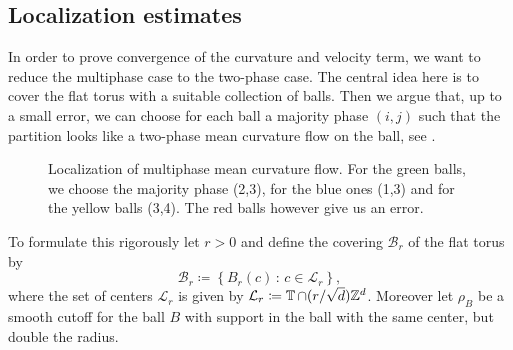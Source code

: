 \subsection{Localization estimates}
\label{section_localization_estimates}
In order to prove convergence of the curvature and velocity term, we want to 
reduce the multiphase case to the two-phase case. The central idea here is to 
cover the flat torus with a suitable collection of balls. Then we argue that, 
up to a small error, we can choose 
for each ball a majority phase $ (i, j) $ such that the partition looks like a 
two-phase mean curvature flow on the ball, see 
.

\begin{figure}[h]
	\centering
	\caption{Localization of multiphase mean curvature flow. For the green 
	balls, we choose the majority phase (2,3), for the blue ones (1,3) and for 
	the yellow balls (3,4). The red balls however give us an error.}
	
	\label{figure_localization_of_mmcf}
\end{figure}

To formulate this rigorously let $ r > 0 $ and define the covering $ \mathcal{ 
B }_{ r 
} $ of the flat torus by
\begin{equation*}
	\mathcal{B}_{ r } \coloneqq
	\left\{
	B_{ r } ( c ) 
	\, \colon \,
	c \in \mathcal{ L }_{ r }
	\right\},
\end{equation*}
where the set of centers $ \mathcal{ L }_{ r } $ is given by $ \mathcal{ L }_{ 
	r } \coloneqq \operatorname{\mathbb{T}} \cap (r/\sqrt{ d }) \mathbb{ Z }^{ d } $. Moreover 
	let 
$ \rho_{ B } $ be a smooth cutoff for the ball $ B $ with support in the ball 
with the same center, but double the radius.

